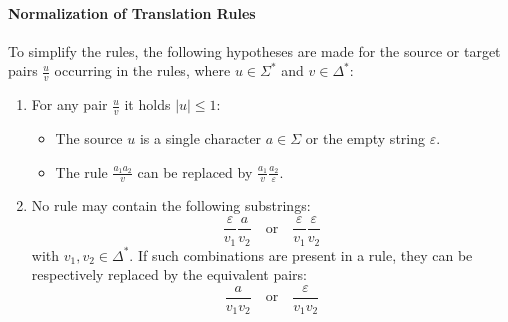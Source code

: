 \paragraph*{Normalization of Translation Rules}
To simplify the rules, the following hypotheses are made for the source or target pairs $\frac{u}{v}$ occurring in the rules, where $u \in \Sigma^{\ast}$ and $v \in \Delta^{\ast}$:
\begin{enumerate}
    \item For any pair $\frac{u}{v}$ it holds $\mid u\mid  \leq 1$: 
        \begin{itemize}
            \item The source $u$ is a single character $a \in \Sigma$ or the empty string $\varepsilon$.
            \item The rule $\frac{a_1 a_2}{v}$ can be replaced by $\frac{a_1}{v}\frac{a_2}{\varepsilon}$.
        \end{itemize}
    \item No rule may contain the following substrings:
        \[ \dfrac{\varepsilon}{v_1} \dfrac{a}{v_2} \quad \text{or} \quad \dfrac{\varepsilon}{v_1} \dfrac{\varepsilon}{v_2} \]
        with $v_1, v_2 \in \Delta^{\ast}$. 
        If such combinations are present in a rule, they can be respectively replaced by the equivalent pairs: 
        \[ \dfrac{a}{v_1 v_2} \quad \text{or} \quad \dfrac{\varepsilon}{v_1 v_2} \]
\end{enumerate}

